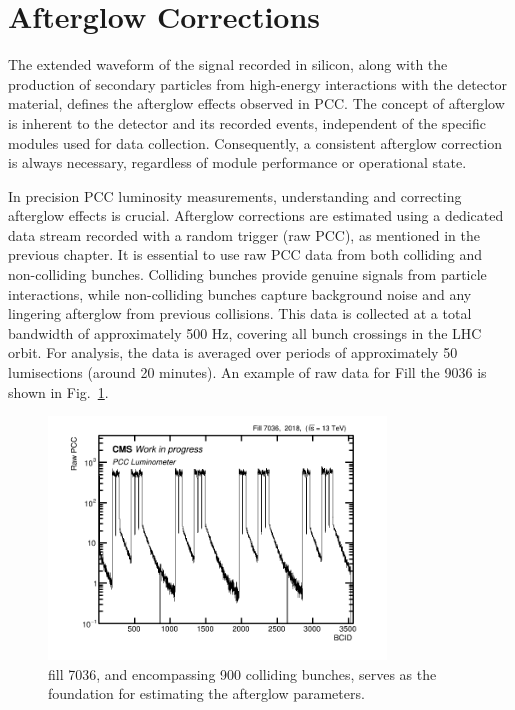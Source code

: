 \section{Afterglow Corrections}


The extended waveform of the signal recorded in silicon, along with the production of secondary particles from high-energy interactions with the detector material, defines the afterglow effects observed in PCC. The concept of afterglow is inherent to the detector and its recorded events, independent of the specific modules used for data collection. Consequently, a consistent afterglow correction is always necessary, regardless of module performance or operational state.

In precision PCC luminosity measurements, understanding and correcting afterglow effects is crucial. Afterglow corrections are estimated using a dedicated data stream recorded with a random trigger (raw PCC), as mentioned in the previous chapter. It is essential to use raw PCC data from both colliding and non-colliding bunches. Colliding bunches provide genuine signals from particle interactions, while non-colliding bunches capture background noise and any lingering afterglow from previous collisions. This data is collected at a total bandwidth of approximately 500 Hz, covering all bunch crossings in the LHC orbit. For analysis, the data is averaged over periods of approximately 50 lumisections (around 20 minutes). An example of raw data for Fill the 9036 is shown in Fig.~\ref{fig:af_fit40}.


\begin{figure}[H]
\centering
\includegraphics[width=0.8\textwidth]{figures/fill_7036_pattern_2.png}
\caption[7036 fill patern]{fill 7036,  and encompassing 900 colliding bunches, serves as the foundation for estimating the afterglow parameters.
}
\label{fig:af_fit40}
\end{figure}


